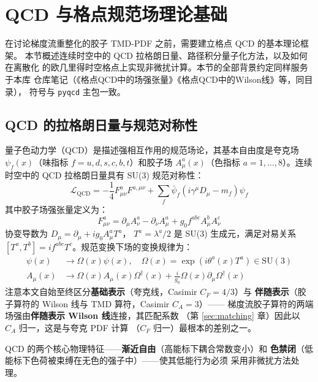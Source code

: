 \documentclass[11pt,a4paper]{ctexart}
\newcommand{\code}[1]{\texttt{#1}}
\begin{document}
\section{QCD 与格点规范场理论基础}

在讨论梯度流重整化的胶子 TMD-PDF 之前，需要建立格点 QCD 的基本理论框架。
本节概述连续时空中的 QCD 拉格朗日量、路径积分量子化方法，以及如何在离散化
的欧几里得时空格点上实现非微扰计算。本节的全部背景约定同样服务于本库
仓库笔记（《格点QCD中的场强张量》《格点QCD中的Wilson线》等，同目录），
符号与 \code{pyqcd} 主包一致。

\subsection{QCD 的拉格朗日量与规范对称性}

量子色动力学（QCD）是描述强相互作用的规范场论，其基本自由度是夸克场
$\psi_f(x)$（味指标 $f = u, d, s, c, b, t$）和胶子场 $A_\mu^a(x)$（色指标
$a = 1,\ldots,8$）。连续时空中的 QCD 拉格朗日量具有 SU(3) 规范对称性：
\begin{equation}
\mathcal{L}_{\text{QCD}} = -\frac{1}{4} F_{\mu\nu}^a F^{a,\mu\nu}
+ \sum_f \bar{\psi}_f (i\gamma^\mu D_\mu - m_f) \psi_f
\end{equation}
其中胶子场强张量定义为：
\begin{equation}
F_{\mu\nu}^a = \partial_\mu A_\nu^a - \partial_\nu A_\mu^a
+ g_0 f^{abc} A_\mu^b A_\nu^c
\end{equation}
协变导数为 $D_\mu = \partial_\mu + i g_0 A_\mu^a T^a$，
$T^a = \lambda^a/2$ 是 SU(3) 生成元，满足对易关系
$[T^a, T^b] = i f^{abc} T^c$。规范变换下场的变换规律为：
\begin{align}
\psi(x) &\to \Omega(x) \psi(x), \quad
\Omega(x) = \exp(i \theta^a(x) T^a) \in \text{SU}(3) \\
A_\mu(x) &\to \Omega(x) A_\mu(x) \Omega^\dagger(x)
+ \frac{i}{g_0} \Omega(x) \partial_\mu \Omega^\dagger(x)
\end{align}
注意本文自始至终区分\textbf{基础表示}（夸克线，Casimir $C_F=4/3$）与
\textbf{伴随表示}（胶子算符的 Wilson 线与 TMD 算符，Casimir $C_A=3$）——
梯度流胶子算符的两端场强由\textbf{伴随表示 Wilson 线}连接，其匹配系数
（第 \ref{sec:matching} 章）因此以 $C_A$ 归一，这是与夸克 PDF 计算
（$C_F$ 归一）最根本的差别之一。

QCD 的两个核心物理特征——\textbf{渐近自由}（高能标下耦合常数变小）和
\textbf{色禁闭}（低能标下色荷被束缚在无色的强子中）——使其低能行为必须
采用非微扰方法处理。
\end{document}
